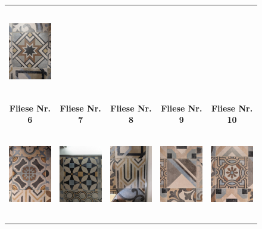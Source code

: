 \documentclass{cssheet}
\begin{document}
\begin{figure}[H]
\begin{tabular}{ccccc}
		\includegraphics[height=4cm]{fliesen/fliese05.jpg} \\
		\textbf{Fliese Nr. 6} & \textbf{Fliese Nr. 7} & \textbf{Fliese Nr. 8} & \textbf{Fliese Nr. 9} & \textbf{Fliese Nr. 10} \\
		\includegraphics[height=4cm]{fliesen/fliese06.jpg} &
		\includegraphics[height=4cm]{fliesen/fliese07.jpg} &
		\includegraphics[height=4cm]{fliesen/fliese08.jpg} &
		\includegraphics[height=4cm]{fliesen/fliese09.jpg} &
		\includegraphics[height=4cm]{fliesen/fliese10.jpg} \\

\end{tabular}
\end{figure}
\end{document}
